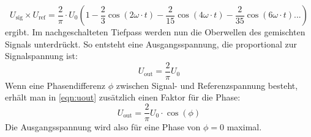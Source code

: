 \begin{equation}
    U_\text{sig} \times U_\text{ref} = \frac{2}{\pi} \cdot U_0(1 - \frac{2}{3}\cos(2\omega \cdot t)  -  \frac{2}{15}\cos(4\omega \cdot t) - \frac{2}{35}\cos(6\omega \cdot t)...)
    \label{eqn:urefsig}
\end{equation}
\noindent
ergibt. Im nachgeschalteten Tiefpass werden nun die Oberwellen des gemischten Signals unterdrückt. So entsteht eine Ausgangsspannung, die proportional zur Signalspannung ist:
\begin{equation}
    U_\text{out} = \frac{2}{\pi} U_0 
    \label{eqn:uout}
\end{equation}
\noindent
Wenn eine Phasendifferenz $\phi$ zwischen Signal- und Referenzspannung besteht, erhält man in \autoref{eqn:uout} zusätzlich einen Faktor für die Phase:
\begin{equation}
    U_\text{out} = \frac{2}{\pi} U_0 \cdot \cos(\phi)
    \label{eqn:uout2}
\end{equation}
\noindent
Die Ausgangsspannung wird also für eine Phase von $\phi=0$ maximal.